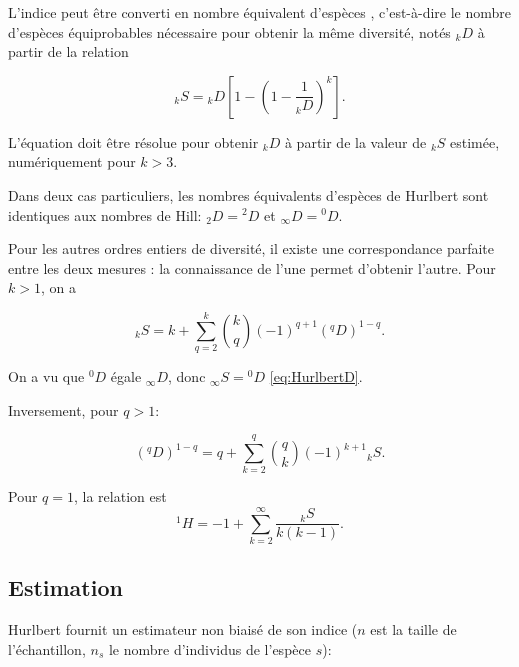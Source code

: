 \documentclass[
  11pt,
  american,
  a4paper,
  extrafontsizes,onecolumn,openright
  ]{memoir}
\newlength{\rf}
\begin{document}
L'indice peut être converti en nombre équivalent d'espèces \autocite{Dauby2012}, c'est-à-dire le nombre d'espèces équiprobables nécessaire pour obtenir la même diversité, notés \(_{k}D\) à partir de la relation

\begin{equation}
  \label{eq:HurlbertD}
  _{k}S = {_{k}D} \left[ 1 - {\left( 1 - \frac{1}{_{k}D} \right)}^k \right].
\end{equation}

L'équation doit être résolue pour obtenir \(_{k}D\) à partir de la valeur de \(_{k}S\) estimée, numériquement pour \(k>3\).

Dans deux cas particuliers, les nombres équivalents d'espèces de Hurlbert sont identiques aux nombres de Hill: \(_{2}D = {^{2}\!D}\) et \(_{\infty}D = {^{0}\!D}\).

Pour les autres ordres entiers de diversité, il existe une correspondance parfaite entre les deux mesures \autocite[Annexe S2]{Chao2014}: la connaissance de l'une permet d'obtenir l'autre. Pour \(k>1\), on a \autocite{Leinster2012}

\begin{equation}
  \label{eq:HurlbertDq}
  _{k}S = k + \sum_{q=2}^{k}{\binom{k}{q} \left( -1 \right)^{q + 1} \left( ^{q}\!D \right)^{1-q}}.
\end{equation}

On a vu que \(^{0}\!D\) égale \(_{\infty}D\), donc \(_{\infty}S = {^{0}\!D}\) \eqref{eq:HurlbertD}.

Inversement, pour \(q > 1\):

\begin{equation}
  \label{eq:DqHurlbert}
  (^{q}\!D)^{1-q} = q + \sum_{k=2}^{q}{\binom{q}{k} \left( -1 \right)^{k + 1} {_{k}S}}.
\end{equation}

Pour \(q=1\), la relation est \autocite{Mao2007}
\begin{equation}
  \label{eq:Mao2007}
  ^{1}\!H = -1 + \sum_{k=2}^{\infty}{\frac{_{k}S}{k \left( k - 1 \right)}}.
\end{equation}

\subsection{Estimation}\label{estimation-1}

Hurlbert fournit un estimateur non biaisé de son indice (\(n\) est la taille de l'échantillon, \(n_s\) le nombre d'individus de l'espèce \(s\)):
\end{document}
